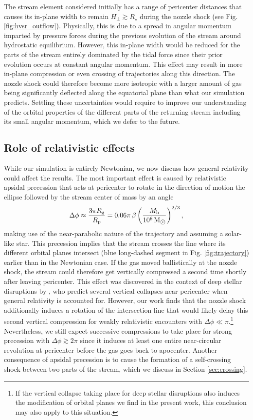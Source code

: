 \documentclass[a4paper,fleqn,usenatbib]{mnras}
\newcommand{\be}{\begin{equation}}
\newcommand{\ee}{\end{equation}}
\newcommand{\rstar}{R_{\star}}
\newcommand{\rp}{R_{\rm p}}
\newcommand{\mh}{M_{\rm h}}
\newcommand{\rg}{R_{\rm g}}
\def\msun{\, \mathrm{M}_{\hbox{$\odot$}}}
\begin{document}
The stream element considered initially has a range of pericenter distances that causes its in-plane width to remain $H_{\perp}\gtrsim \rstar$ during the nozzle shock (see Fig. \ref{fig:hvsr_outflow}). Physically, this is due to a spread in angular momentum imparted by pressure forces during the previous evolution of the stream around hydrostatic equilibrium. However, this in-plane width would be reduced for the parts of the stream entirely dominated by the tidal force since their prior evolution occurs at constant angular momentum. This effect may result in more in-plane compression or even crossing of trajectories along this direction. The nozzle shock could therefore become more isotropic with a larger amount of gas being significantly deflected along the equatorial plane than what our simulation predicts. Settling these uncertainties would require to improve our understanding of the orbital properties of the different parts of the returning stream including its small angular momentum, which we defer to the future.




\subsection{Role of relativistic effects}
\label{sec:relativistic}



While our simulation is entirely Newtonian, we now discuss how general relativity could affect the results. The most important effect is caused by relativistic apsidal precession that acts at pericenter to rotate in the direction of motion the ellipse followed by the stream center of mass by an angle \citep{hobson2006}
\be
\Delta \phi \approx  \frac{3 \pi\rg}{\rp} = 0.06  \pi \, \beta \left( \frac{\mh}{10^6 \msun} \right)^{2/3},
\label{eq:apsidal}
\ee
making use of the near-parabolic nature of the trajectory and assuming a solar-like star. This precession implies that the stream crosses the line where its different orbital planes intersect (blue long-dashed segment in Fig. \ref{fig:trajectory}) earlier than in the Newtonian case. If the gas moved ballistically at the nozzle shock, the stream could therefore get vertically compressed a second time shortly after leaving pericenter. This effect was discovered in the context of deep stellar disruptions by \citet{luminet1985}, who predict several vertical collapses near pericenter when general relativity is accounted for. However, our work finds that the nozzle shock additionally induces a rotation of the intersection line that would likely delay this second vertical compression for weakly relativistic encounters with $\Delta \phi \ll \pi$.\footnote{If the vertical collapse taking place for deep stellar disruptions also induces the modification of orbital planes we find in the present work, this conclusion may also apply to this situation.} Nevertheless, we still expect successive compressions to take place for strong precession with $\Delta \phi \gtrsim 2 \pi$ since it induces at least one entire near-circular revolution at pericenter before the gas goes back to apocenter. Another consequence of apsidal precession is to cause the formation of a self-crossing shock between two parts of the stream, which we discuss in Section \ref{sec:crossing}.
\end{document}
